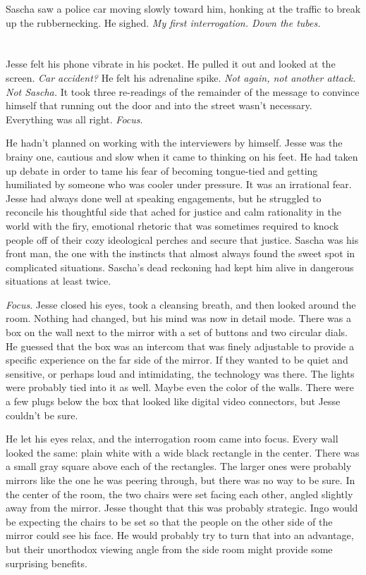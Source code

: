 \documentclass[12pt]{book}
\begin{document}
Sascha saw a police car moving slowly toward him, honking at the traffic to break up the rubbernecking.  He sighed.  \emph{My first interrogation.  Down the tubes.}

\chapter{}

Jesse felt his phone vibrate in his pocket.  He pulled it out and looked at the screen.  \emph{Car accident?}  He felt his adrenaline spike.  \emph{Not again, not another attack.  Not Sascha.}  It took three re-readings of the remainder of the message to convince himself that running out the door and into the street wasn't necessary.  Everything was all right.  \emph{Focus}.

He hadn't planned on working with the interviewers by himself.  Jesse was the brainy one, cautious and slow when it came to thinking on his feet.  He had taken up debate in order to tame his fear of becoming tongue-tied and getting humiliated by someone who was cooler under pressure.  It was an irrational fear.  Jesse had always done well at speaking engagements, but he struggled to reconcile his thoughtful side that ached for justice and calm rationality in the world with the firy, emotional rhetoric that was sometimes required to knock people off of their cozy ideological perches and secure that justice.  Sascha was his front man, the one with the instincts that almost always found the sweet spot in complicated situations.  Sascha's dead reckoning had kept him alive in dangerous situations at least twice.

\emph{Focus}.  Jesse closed his eyes, took a cleansing breath, and then looked around the room.  Nothing had changed, but his mind was now in detail mode.  There was a box on the wall next to the mirror with a set of buttons and two circular dials.  He guessed that the box was an intercom that was finely adjustable to provide a specific experience on the far side of the mirror.  If they wanted to be quiet and sensitive, or perhaps loud and intimidating, the technology was there.  The lights were probably tied into it as well.  Maybe even the color of the walls.  There were a few plugs below the box that looked like digital video connectors, but Jesse couldn't be sure.

He let his eyes relax, and the interrogation room came into focus.  Every wall looked the same: plain white with a wide black rectangle in the center.  There was a small gray square above each of the rectangles.  The larger ones were probably mirrors like the one he was peering through, but there was no way to be sure.  In the center of the room, the two chairs were set facing each other, angled slightly away from the mirror.  Jesse thought that this was probably strategic.  Ingo would be expecting the chairs to be set so that the people on the other side of the mirror could see his face.  He would probably try to turn that into an advantage, but their unorthodox viewing angle from the side room might provide some surprising benefits.
\end{document}
